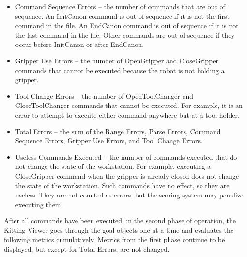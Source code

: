 \begin{itemize}
\item \small \sf Command Sequence Errors \rm \normalsize -- the number of
commands that are out of sequence. An InitCanon command is out of sequence
if it is not the first command in the file. An EndCanon command is out of
sequence if it is not the last command in the file. Other commands are out
of sequence if they occur before InitCanon or after EndCanon.

\item \small \sf Gripper Use Errors \rm \normalsize -- the number of
OpenGripper and CloseGripper commands that cannot be executed because the
robot is not holding a gripper.

\item \small \sf Tool Change Errors \rm \normalsize -- the number of
OpenToolChanger and CloseToolChanger commands that cannot be executed. For
example, it is an error to attempt to execute either command anywhere but
at a tool holder.

\item \small \sf Total Errors \rm \normalsize -- the sum of the Range
Errors, Parse Errors, Command Sequence Errors, Gripper Use Errors, and Tool
Change Errors.

\item \small \sf Useless Commands Executed \rm \normalsize -- the number
of commands executed that do not change the state of the workstation. For
example, executing a CloseGripper command when the gripper is already
closed does not change the state of the workstation. Such commands have no
effect, so they are useless. They are not counted as errors, but the
scoring system may penalize executing them.

\end{itemize}

After all commands have been executed, in the second phase of operation,
the Kitting Viewer goes through the goal objects one at a time and
evaluates the following metrics cumulatively. Metrics from the first
phase continue to be displayed, but except for Total Errors, are not
changed.

